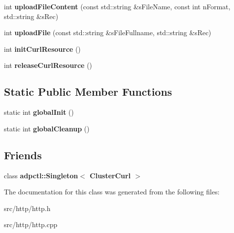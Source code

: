 \begin{DoxyCompactItemize}
\item 
\mbox{\label{classadpc_1_1ClusterCurl_afd2b2b6d8bc96ea452c73c3df1c432e5}} 
int {\bfseries upload\+File\+Content} (const std\+::string \&s\+File\+Name, const int n\+Format, std\+::string \&s\+Rec)
\item 
\mbox{\label{classadpc_1_1ClusterCurl_a3a892af9d597108c2026b081d05c1a46}} 
int {\bfseries upload\+File} (const std\+::string \&s\+File\+Fullname, std\+::string \&s\+Rec)
\item 
\mbox{\label{classadpc_1_1ClusterCurl_af656fd7b837a64751775e089a277c791}} 
int {\bfseries init\+Curl\+Resource} ()
\item 
\mbox{\label{classadpc_1_1ClusterCurl_a570f08272147d8fbf4a0ec803a475fde}} 
int {\bfseries release\+Curl\+Resource} ()
\end{DoxyCompactItemize}
\subsection*{Static Public Member Functions}
\begin{DoxyCompactItemize}
\item 
\mbox{\label{classadpc_1_1ClusterCurl_a95fc974d514e1457e857be9ef5542ca9}} 
static int {\bfseries global\+Init} ()
\item 
\mbox{\label{classadpc_1_1ClusterCurl_a1468e0bcc34d2164c6596cda5ab0445e}} 
static int {\bfseries global\+Cleanup} ()
\end{DoxyCompactItemize}
\subsection*{Friends}
\begin{DoxyCompactItemize}
\item 
\mbox{\label{classadpc_1_1ClusterCurl_a4ae98be3ed1359c249b4951c942c400d}} 
class {\bfseries adpctl\+::\+Singleton$<$ Cluster\+Curl $>$}
\end{DoxyCompactItemize}


The documentation for this class was generated from the following files\+:\begin{DoxyCompactItemize}
\item 
src/http/http.\+h\item 
src/http/http.\+cpp\end{DoxyCompactItemize}
